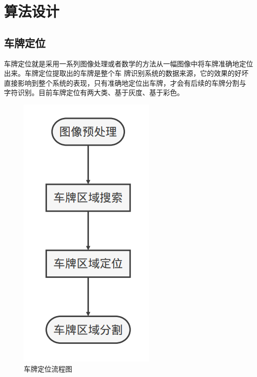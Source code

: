 \chapter{算法设计}
\section{车牌定位}
车牌定位就是采用一系列图像处理或者数学的方法从一幅图像中将车牌准确地定位出来。车牌定位提取出的车牌是整个车
牌识别系统的数据来源，它的效果的好坏直接影响到整个系统的表现，只有准确地定位出车牌，才会有后续的车牌分割与
字符识别。目前车牌定位有两大类、基于灰度、基于彩色。
\begin{figure}[h]
	\centering
	\includegraphics[scale=0.5]{figures/5.png}
	\caption{车牌定位流程图}
	\label{fig:2}
\end{figure}

